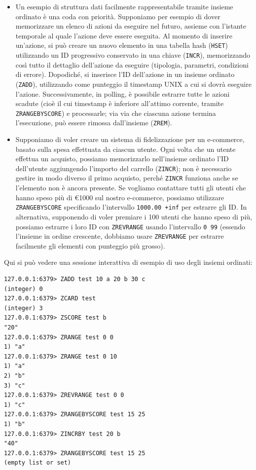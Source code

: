 \begin{itemize}
	\medskip

	\item Un esempio di struttura dati facilmente rappresentabile tramite insieme ordinato è una
	coda con priorità. Supponiamo per esempio di dover memorizzare un elenco di azioni da eseguire
	nel futuro, assieme con l'istante temporale al quale l'azione deve essere eseguita. Al momento
	di inserire un'azione, si può creare un nuovo elemento in una tabella hash (\verb|HSET|)
	utilizzando un ID progressivo conservato in una chiave (\verb|INCR|), memorizzando così tutto
	il dettaglio dell'azione da eseguire (tipologia, parametri, condizioni di errore). Dopodiché,
	si inserisce l'ID dell'azione in un insieme ordinato (\verb|ZADD|), utilizzando come punteggio
	il timestamp UNIX a cui si dovrà eseguire l'azione. Successivamente, in polling, è possibile
	estrarre tutte le azioni scadute (cioè il cui timestamp è inferiore all'attimo corrente,
	tramite \verb|ZRANGEBYSCORE|) e processarle; via via che ciascuna azione termina l'esecuzione,
	può essere rimossa dall'insieme (\verb|ZREM|).

	\item Supponiamo di voler creare un sistema di fidelizzazione per un e-commerce, basato sulla
	spesa effettuata da ciascun utente. Ogni volta che un utente effettua un acquisto, possiamo
	memorizzarlo nell'insieme ordinato l'ID dell'utente aggiungendo l'importo del carrello
	(\verb|ZINCR|); non è necessario gestire in modo diverso il primo acquisto, perché \verb|ZINCR|
	funziona anche se l'elemento non è ancora presente. Se vogliamo contattare tutti gli utenti che
	hanno speso più di €1000 sul nostro e-commerce, possiamo utilizzare \verb|ZRANGEBYSCORE|
	specificando l'intervallo \verb|1000.00 +inf| per estrarre gli ID. In alternativa, supponendo di
	voler premiare i 100 utenti che hanno speso di più, possiamo estrarre i loro ID con
	\verb|ZREVRANGE| usando l'intervallo \verb|0 99| (essendo l'insieme in ordine crescente,
	dobbiamo usare \verb|ZREVRANGE| per estrarre facilmente gli elementi con punteggio più grosso).
\end{itemize}

Qui si può vedere una sessione interattiva di esempio di uso degli insiemi ordinati:

\medskip
\begin{lstlisting}
127.0.0.1:6379> ZADD test 10 a 20 b 30 c
(integer) 0
127.0.0.1:6379> ZCARD test
(integer) 3
127.0.0.1:6379> ZSCORE test b
"20"
127.0.0.1:6379> ZRANGE test 0 0
1) "a"
127.0.0.1:6379> ZRANGE test 0 10
1) "a"
2) "b"
3) "c"
127.0.0.1:6379> ZREVRANGE test 0 0
1) "c"
127.0.0.1:6379> ZRANGEBYSCORE test 15 25
1) "b"
127.0.0.1:6379> ZINCRBY test 20 b
"40"
127.0.0.1:6379> ZRANGEBYSCORE test 15 25
(empty list or set)
\end{lstlisting}


